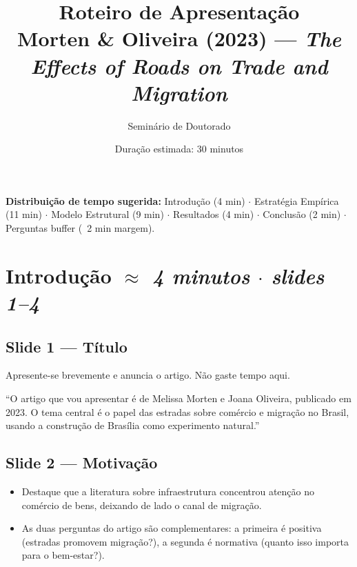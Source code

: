\documentclass[12pt, a4paper]{article}
\title{\textbf{Roteiro de Apresentação}\\[4pt]
       \large Morten \& Oliveira (2023) ---
       \textit{The Effects of Roads on Trade and Migration}}
\author{Seminário de Doutorado}
\date{Duração estimada: 30 minutos}
\begin{document}
\maketitle
\thispagestyle{empty}

\begin{mdframed}[style=tempo]
\textbf{Distribuição de tempo sugerida:}
Introdução (4 min) $\cdot$
Estratégia Empírica (11 min) $\cdot$
Modelo Estrutural (9 min) $\cdot$
Resultados (4 min) $\cdot$
Conclusão (2 min) $\cdot$
Perguntas buffer (~2 min margem).
\end{mdframed}

\vspace{0.5cm}

\section{Introdução \hfill \normalfont\small\textit{$\approx$ 4 minutos $\cdot$ slides 1--4}}

\subsection*{Slide 1 --- Título}

Apresente-se brevemente e anuncia o artigo. Não gaste tempo aqui.

\begin{mdframed}[style=sintese]
``O artigo que vou apresentar é de Melissa Morten e Joana Oliveira, publicado em 2023.
O tema central é o papel das estradas sobre comércio e migração no Brasil, usando a
construção de Brasília como experimento natural.''
\end{mdframed}

\subsection*{Slide 2 --- Motivação}

\begin{itemize}
    \item Destaque que a literatura sobre infraestrutura concentrou atenção no comércio de bens, deixando de lado o canal de migração.
    \item As duas perguntas do artigo são complementares: a primeira é positiva (estradas promovem migração?), a segunda é normativa (quanto isso importa para o bem-estar?).
\end{itemize}
\end{document}
